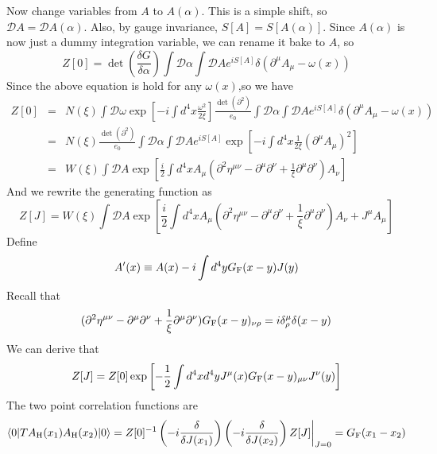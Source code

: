 Now change variables from $A$ to $A(\alpha)$. This is a simple shift, so $\mathcal{D}A = \mathcal{D}A(\alpha)$. Also, by gauge invariance, $S[A] = S[A(\alpha)]$. Since $A(\alpha)$ is now just a dummy integration variable, we can rename it bake to $A$, so
\[Z[0] = \det \left( \frac{\delta G}{\delta \alpha} \right) \int \mathcal{D}\alpha \int \mathcal{D}A e^{iS[A]} \delta(\partial^{\mu}A_{\mu} - \omega(x))\]
Since the above equation is hold for any $\omega(x)$,so we have
\begin{eqnarray}
Z[0] &=& N(\xi) \int \mathcal{D}\omega \exp\left[ -i \int d^4x \frac{\omega^2}{2\xi} \right] \frac{\det(\partial^2)}{e_0} \int \mathcal{D}\alpha \int \mathcal{D}A e^{iS[A]} \delta(\partial^{\mu}A_{\mu} - \omega(x)) \nonumber \\
&=& N(\xi) \frac{\det(\partial^2)}{e_0} \int \mathcal{D}\alpha \int \mathcal{D}A e^{iS[A]} \exp\left[ -i \int d^4x \frac{1}{2\xi} (\partial^{\mu}A_{\mu})^2\right] \nonumber \\
&=& W(\xi) \int \mathcal{D}A \exp\left[ \frac{i}{2} \int d^4x  A_{\mu} (\partial^2\eta^{\mu\nu} - \partial^{\mu}\partial^{\nu} + \frac{1}{\xi} \partial^{\mu} \partial^{\nu})A_{\nu}\right] \nonumber
\end{eqnarray}
And we rewrite the generating function as
\[Z[J] = W(\xi) \int \mathcal{D}A \exp\left[ \frac{i}{2} \int d^4x  A_{\mu} (\partial^2\eta^{\mu\nu} - \partial^{\mu}\partial^{\nu} + \frac{1}{\xi} \partial^{\mu} \partial^{\nu})A_{\nu} + J^{\mu} A_{\mu}\right]\]
Define
\[A'(x) \equiv A(x) - i \int d^4y G_{\rm F}(x-y)J(y)\]
Recall that
\[(\partial^2\eta^{\mu\nu} - \partial^{\mu}\partial^{\nu} + \frac{1}{\xi} \partial^{\mu} \partial^{\nu})G_{\rm F}(x-y)_{\nu \rho} = i\delta^{\mu}_{\rho}\delta(x-y)\]
We can derive that
\[Z[J]=Z[0] \exp \left[ -\frac{1}{2} \int d^4x d^4y J^{\mu}(x) G_{\rm F}(x-y)_{\mu\nu}J^{\nu}(y) \right]\]
The two point correlation functions are
\[\langle 0 | T A_{\rm H}(x_1) A_{\rm H}(x_2)| 0 \rangle = Z[0]^{-1} \left(-i \frac{\delta}{\delta J(x_1)} \right) \left(-i \frac{\delta}{\delta J(x_2)} \right) Z[J]\bigg|_{J=0} = G_{\rm F}(x_1-x_2) \]

